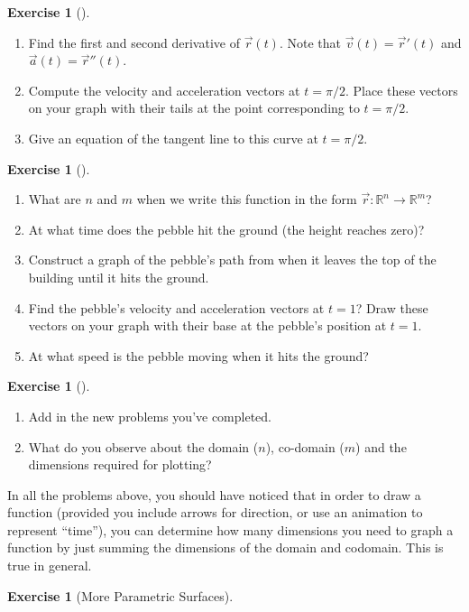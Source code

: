 \documentclass[10pt,]{book}
\theoremstyle{plain}
\theoremstyle{definition}
\theoremstyle{definition}
\theoremstyle{definition}
\theoremstyle{definition}
\newtheorem{exploration}[project]{Exercise}
\theoremstyle{definition}
\numberwithin{equation}{section}
\begin{document}
\begin{exploration}[]\label{exploration-106}
\leavevmode%
\begin{enumerate}[font=\bfseries,label=(\alph*),ref=\alph*]
\item\label{task-193} Find the first and second derivative of \(\vec r(t)\). Note that \(\vec{v}(t) = \vec{r}'(t)\) and \(\vec{a}(t)=\vec{r}''(t)\).%
\item\label{task-194} Compute the velocity and acceleration vectors at \(t=\pi/2\). Place these vectors on your graph with their tails at the point corresponding to \(t=\pi/2\).%
\item\label{task-195} Give an equation of the tangent line to this curve at \(t=\pi/2\).%
\end{enumerate}
\end{exploration}
\begin{exploration}[]\label{exploration-107}
\leavevmode%
\begin{enumerate}[font=\bfseries,label=(\alph*),ref=\alph*]
\item\label{task-196} What are \(n\) and \(m\) when we write this function in the form  \(\vec r\colon {\mathbb{R}}^n\to {\mathbb{R}}^m\)?%
\item\label{task-197} At what time does the pebble hit the ground (the height reaches zero)?%
\item\label{task-198} Construct a graph of the pebble's path from when it leaves the top of the building until it hits the ground.%
\item\label{task-199} Find the pebble's velocity and acceleration vectors at \(t=1\)? Draw these vectors on your graph with their base at the pebble's position at \(t=1\).%
\item\label{task-200} At what speed is the pebble moving when it hits the ground?%
\end{enumerate}
\end{exploration}
\begin{exploration}[]\label{exploration-108}
\leavevmode%
\begin{enumerate}[font=\bfseries,label=(\alph*),ref=\alph*]
\item\label{task-201} Add in the new problems you've completed.%
\item\label{task-202} What do you observe about the domain (\(n\)), co-domain (\(m\)) and the dimensions required for plotting?%
\end{enumerate}
\end{exploration}
In all the problems above, you should have noticed that in order to draw a function (provided you include arrows for direction, or use an animation to represent ``time''), you can determine how many dimensions you need to graph a function by just summing the dimensions of the domain and codomain. This is true in general.%
\begin{exploration}[More Parametric Surfaces]\label{second_parametric_surface_example}
\end{exploration}
\typeout{************************************************}
\typeout{************************************************}
\end{document}
